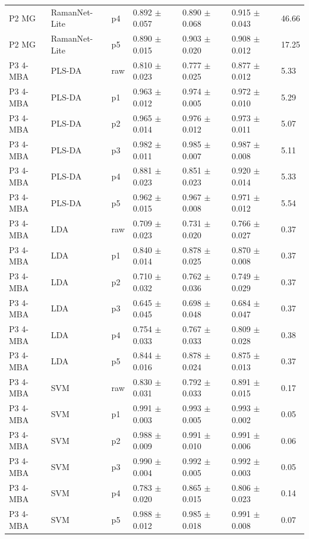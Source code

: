 {\begin{longtable}{L{2.35cm}L{2.4cm}L{1.0cm}L{2.35cm}L{2.25cm}L{2.25cm}L{1.45cm}}
P2 MG & RamanNet-Lite & p4 & 0.892 $\pm$ 0.057 & 0.890 $\pm$ 0.068 & 0.915 $\pm$ 0.043 & 46.66 \\
P2 MG & RamanNet-Lite & p5 & 0.890 $\pm$ 0.015 & 0.903 $\pm$ 0.020 & 0.908 $\pm$ 0.012 & 17.25 \\
P3 4-MBA & PLS-DA & raw & 0.810 $\pm$ 0.023 & 0.777 $\pm$ 0.025 & 0.877 $\pm$ 0.012 & 5.33 \\
P3 4-MBA & PLS-DA & p1 & 0.963 $\pm$ 0.012 & 0.974 $\pm$ 0.005 & 0.972 $\pm$ 0.010 & 5.29 \\
P3 4-MBA & PLS-DA & p2 & 0.965 $\pm$ 0.014 & 0.976 $\pm$ 0.012 & 0.973 $\pm$ 0.011 & 5.07 \\
P3 4-MBA & PLS-DA & p3 & 0.982 $\pm$ 0.011 & 0.985 $\pm$ 0.007 & 0.987 $\pm$ 0.008 & 5.11 \\
P3 4-MBA & PLS-DA & p4 & 0.881 $\pm$ 0.023 & 0.851 $\pm$ 0.023 & 0.920 $\pm$ 0.014 & 5.33 \\
P3 4-MBA & PLS-DA & p5 & 0.962 $\pm$ 0.015 & 0.967 $\pm$ 0.008 & 0.971 $\pm$ 0.012 & 5.54 \\
P3 4-MBA & LDA & raw & 0.709 $\pm$ 0.023 & 0.731 $\pm$ 0.020 & 0.766 $\pm$ 0.027 & 0.37 \\
P3 4-MBA & LDA & p1 & 0.840 $\pm$ 0.014 & 0.878 $\pm$ 0.025 & 0.870 $\pm$ 0.008 & 0.37 \\
P3 4-MBA & LDA & p2 & 0.710 $\pm$ 0.032 & 0.762 $\pm$ 0.036 & 0.749 $\pm$ 0.029 & 0.37 \\
P3 4-MBA & LDA & p3 & 0.645 $\pm$ 0.045 & 0.698 $\pm$ 0.048 & 0.684 $\pm$ 0.047 & 0.37 \\
P3 4-MBA & LDA & p4 & 0.754 $\pm$ 0.033 & 0.767 $\pm$ 0.033 & 0.809 $\pm$ 0.028 & 0.38 \\
P3 4-MBA & LDA & p5 & 0.844 $\pm$ 0.016 & 0.878 $\pm$ 0.024 & 0.875 $\pm$ 0.013 & 0.37 \\
P3 4-MBA & SVM & raw & 0.830 $\pm$ 0.031 & 0.792 $\pm$ 0.033 & 0.891 $\pm$ 0.015 & 0.17 \\
P3 4-MBA & SVM & p1 & 0.991 $\pm$ 0.003 & 0.993 $\pm$ 0.005 & 0.993 $\pm$ 0.002 & 0.05 \\
P3 4-MBA & SVM & p2 & 0.988 $\pm$ 0.009 & 0.991 $\pm$ 0.010 & 0.991 $\pm$ 0.006 & 0.06 \\
P3 4-MBA & SVM & p3 & 0.990 $\pm$ 0.004 & 0.992 $\pm$ 0.005 & 0.992 $\pm$ 0.003 & 0.05 \\
P3 4-MBA & SVM & p4 & 0.783 $\pm$ 0.020 & 0.865 $\pm$ 0.015 & 0.806 $\pm$ 0.023 & 0.14 \\
P3 4-MBA & SVM & p5 & 0.988 $\pm$ 0.012 & 0.985 $\pm$ 0.018 & 0.991 $\pm$ 0.008 & 0.07 \\

\end{longtable}}
